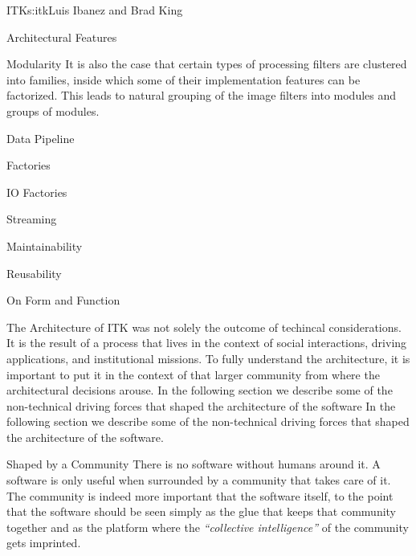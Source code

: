\begin{aosachapter}{ITK}{s:itk}{Luis Ibanez and Brad King}
\begin{aosasect1}{Architectural Features}
\begin{aosasect2}{Modularity}
It is also the case that certain types of processing filters are clustered into
families, inside which some of their implementation features can be factorized.
This leads to natural grouping of the image filters into modules and groups of
modules.

\end{aosasect2}

\begin{aosasect2}{Data Pipeline}
\end{aosasect2}

\begin{aosasect2}{Factories}
\end{aosasect2}

\begin{aosasect2}{IO Factories}
\end{aosasect2}

\begin{aosasect2}{Streaming}
\end{aosasect2}

\begin{aosasect2}{Maintainability}
\end{aosasect2}

\begin{aosasect2}{Reusability}
\end{aosasect2}

\end{aosasect1}

\begin{aosasect1}{On Form and Function}

The Architecture of ITK was not solely the outcome of techincal
considerations. It is the result of a process that lives in the
context of social interactions, driving applications, and
institutional missions. To fully understand the architecture, it is
important to put it in the context of that larger community from where
the architectural decisions arouse. In the following section we
describe some of the non-technical driving forces that shaped the
architecture of the software In the following section we describe some
of the non-technical driving forces that shaped the architecture of
the software.

\begin{aosasect2}{Shaped by a Community}
There is no software without humans around it. A software is only
useful when surrounded by a community that takes care of it. The
community is indeed more important that the software itself, to the
point that the software should be seen simply as the glue that keeps
that community together and as the platform where the \emph{``collective
intelligence''} of the community gets imprinted.
\end{aosasect2}


\end{aosasect1}
\end{aosachapter}
